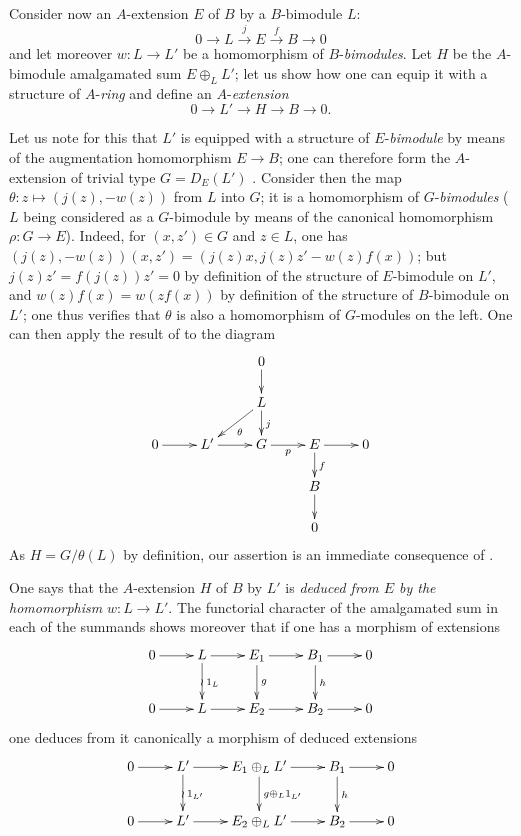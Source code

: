 \begin{env}[18.2.8]
\label{0.18.2.8}
Consider now an $A$-extension $E$ of $B$ by a $B$-bimodule $L$:
\[
  0\to L\xrightarrow{j} E\xrightarrow{f} B\to 0
\]
and let moreover $w:L\to L'$ be a homomorphism of $B$-\emph{bimodules}.
Let $H$ be the $A$-bimodule amalgamated sum $E\oplus_L L'$; let us show how one can equip it with a structure of $A$-\emph{ring} and define an $A$-\emph{extension}
\[
  0\to L'\to H\to B\to 0.
\]

Let us note for this that $L'$ is equipped with a structure of $E$-\emph{bimodule} by means of the augmentation homomorphism $E\to B$; one can therefore form the $A$-extension of trivial type $G=D_E(L')$ .
Consider then the map $\theta:z\mapsto(j(z),-w(z))$ from $L$ into $G$; it is a homomorphism of $G$-\emph{bimodules} ($L$ being considered as a $G$-bimodule by means of the canonical homomorphism $\rho:G\to E$).
Indeed, for $(x,z')\in G$ and $z\in L$, one has $(j(z),-w(z))(x,z')=(j(z)x,j(z)z'-w(z)f(x))$; but $j(z)z'=f(j(z))z'=0$ by definition of the structure of $E$-bimodule on $L'$, and $w(z)f(x)=w(zf(x))$ by definition of the structure of $B$-bimodule on $L'$; one thus verifies that $\theta$ is also a homomorphism of $G$-modules on the left.
One can then apply the result of  to the diagram
\[
  \xymatrix@C=2pc@R=1.4pc{
    & & 0\ar[d] & & \\
    & & L\ar[ld]^\theta\ar[d]^j & & \\
    0\ar[r] & L'\ar[r] & G\ar[r]_p & E\ar[r]\ar[d]^f & 0\\
    & & & B\ar[d]\\
    & & & 0
  }
\]
As $H=G/\theta(L)$ by definition, our assertion is an immediate consequence of .


One says that the $A$-extension $H$ of $B$ by $L'$ is \emph{deduced from $E$ by the homomorphism} $w:L\to L'$.
The functorial character of the amalgamated sum in each of the summands shows moreover that if one has a morphism of extensions
\[
  \xymatrix{
    0\ar[r] & L\ar[r]\ar[d]^{1_L}\ar@{}[d]|{\wr} & E_1\ar[r]\ar[d]^g & B_1\ar[r]\ar[d]^h & 0\\
    0\ar[r] & L\ar[r] & E_2\ar[r] & B_2\ar[r] & 0
  }
\]
one deduces from it canonically a morphism of deduced extensions
\[
  \xymatrix{
    0\ar[r] & L'\ar[r]\ar[d]^{1_{L'}}\ar@{}[d]|{\wr} & E_1\oplus_L L'\ar[r]\ar[d]^{g\oplus_L1_{L'}} & B_1\ar[r]\ar[d]^h & 0\\
    0\ar[r] & L'\ar[r] & E_2\oplus_L L'\ar[r] & B_2\ar[r] & 0
  }
\]


\end{env}
